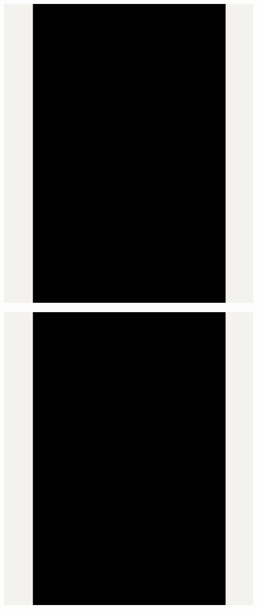 \Continuing
\begin{center}
    \includegraphics[width=40em]{gde-member-interviewer-linkedin-p2_public}
\end{center}
\WillContinue
\pagebreak

\Continuing
\begin{center}
    \includegraphics[width=40em]{gde-member-interviewer-linkedin-p3_public}
\end{center}
\WillContinue
\pagebreak

